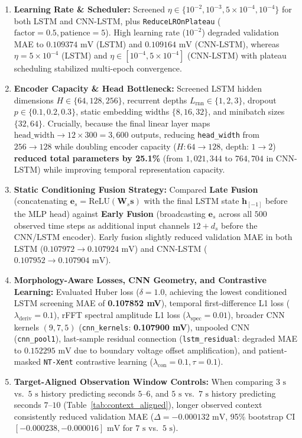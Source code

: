 \documentclass[11pt,a4paper]{article}
\begin{document}
\begin{enumerate}
    \item \textbf{Learning Rate \& Scheduler:} Screened $\eta \in \{10^{-2}, 10^{-3}, 5\times 10^{-4}, 10^{-4}\}$ for both LSTM and CNN-LSTM, plus \texttt{ReduceLROnPlateau} ($\text{factor}=0.5, \text{patience}=5$). High learning rate ($10^{-2}$) degraded validation MAE to $0.109374\text{ mV}$ (LSTM) and $0.109164\text{ mV}$ (CNN-LSTM), whereas $\eta = 5\times 10^{-4}$ (LSTM) and $\eta \in [10^{-4}, 5\times 10^{-4}]$ (CNN-LSTM) with plateau scheduling stabilized multi-epoch convergence.
    \item \textbf{Encoder Capacity \& Head Bottleneck:} Screened LSTM hidden dimensions $H \in \{64, 128, 256\}$, recurrent depths $L_{\text{rnn}} \in \{1, 2, 3\}$, dropout $p \in \{0.1, 0.2, 0.3\}$, static embedding widths $\{8, 16, 32\}$, and minibatch sizes $\{32, 64\}$. Crucially, because the final linear layer maps $\text{head\_width} \to 12 \times 300 = 3{,}600$ outputs, reducing \texttt{head\_width} from $256 \to 128$ while doubling encoder capacity ($H: 64 \to 128$, depth: $1 \to 2$) \textbf{reduced total parameters by 25.1\%} (from $1{,}021{,}344$ to $764{,}704$ in CNN-LSTM) while improving temporal representation capacity.
    \item \textbf{Static Conditioning Fusion Strategy:} Compared \textbf{Late Fusion} (concatenating $\mathbf{e}_s = \text{ReLU}(\mathbf{W}_s \mathbf{s})$ with the final LSTM state $\mathbf{h}_{[-1]}$ before the MLP head) against \textbf{Early Fusion} (broadcasting $\mathbf{e}_s$ across all $500$ observed time steps as additional input channels $12 + d_s$ before the CNN/LSTM encoder). Early fusion slightly reduced validation MAE in both LSTM ($0.107972 \to 0.107924\text{ mV}$) and CNN-LSTM ($0.107952 \to 0.107904\text{ mV}$).
    \item \textbf{Morphology-Aware Losses, CNN Geometry, and Contrastive Learning:} Evaluated Huber loss ($\delta = 1.0$, achieving the lowest conditioned LSTM screening MAE of \textbf{0.107852 mV}), temporal first-difference L1 loss ($\lambda_{\text{deriv}} = 0.1$), rFFT spectral amplitude L1 loss ($\lambda_{\text{spec}} = 0.01$), broader CNN kernels $(9, 7, 5)$ (\texttt{cnn\_kernels}: \textbf{0.107900 mV}), unpooled CNN (\texttt{cnn\_pool1}), last-sample residual connection (\texttt{lstm\_residual}: degraded MAE to $0.152295\text{ mV}$ due to boundary voltage offset amplification), and patient-masked \texttt{NT-Xent} contrastive learning ($\lambda_{\text{con}} = 0.1, \tau = 0.1$).
    \item \textbf{Target-Aligned Observation Window Controls:} When comparing $3\text{ s}$ vs.\ $5\text{ s}$ history predicting seconds $5\text{--}6$, and $5\text{ s}$ vs.\ $7\text{ s}$ history predicting seconds $7\text{--}10$ (Table~\ref{tab:context_aligned}), longer observed context consistently reduced validation MAE ($\Delta = -0.000132\text{ mV}$, 95\% bootstrap CI $[-0.000238, -0.000016]\text{ mV}$ for $7\text{ s}$ vs.\ $5\text{ s}$).
\end{enumerate}
\end{document}
